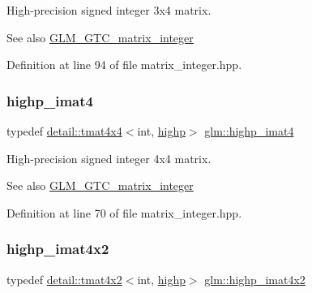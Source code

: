 High-\/precision signed integer 3x4 matrix. \begin{DoxySeeAlso}{See also}
\hyperlink{group__gtc__matrix__integer}{G\+L\+M\+\_\+\+G\+T\+C\+\_\+matrix\+\_\+integer} 
\end{DoxySeeAlso}


Definition at line 94 of file matrix\+\_\+integer.\+hpp.

\mbox{\label{group__gtc__matrix__integer_ga9ca2f5624891bd1ac993fcde4dd24ac1}} 
\subsubsection{\texorpdfstring{highp\+\_\+imat4}{highp\_imat4}}
{\footnotesize\ttfamily typedef \hyperlink{structglm_1_1detail_1_1tmat4x4}{detail\+::tmat4x4}$<$int, \hyperlink{namespaceglm_a0f04f086094c747d227af4425893f545ac6f7eab42eacbb10d59a58e95e362074}{highp}$>$ \hyperlink{group__gtc__matrix__integer_ga9ca2f5624891bd1ac993fcde4dd24ac1}{glm\+::highp\+\_\+imat4}}

High-\/precision signed integer 4x4 matrix. \begin{DoxySeeAlso}{See also}
\hyperlink{group__gtc__matrix__integer}{G\+L\+M\+\_\+\+G\+T\+C\+\_\+matrix\+\_\+integer} 
\end{DoxySeeAlso}


Definition at line 70 of file matrix\+\_\+integer.\+hpp.

\mbox{\label{group__gtc__matrix__integer_gad998dce143f674a95a25241ff6e5e7d2}} 
\subsubsection{\texorpdfstring{highp\+\_\+imat4x2}{highp\_imat4x2}}
{\footnotesize\ttfamily typedef \hyperlink{structglm_1_1detail_1_1tmat4x2}{detail\+::tmat4x2}$<$int, \hyperlink{namespaceglm_a0f04f086094c747d227af4425893f545ac6f7eab42eacbb10d59a58e95e362074}{highp}$>$ \hyperlink{group__gtc__matrix__integer_gad998dce143f674a95a25241ff6e5e7d2}{glm\+::highp\+\_\+imat4x2}}

